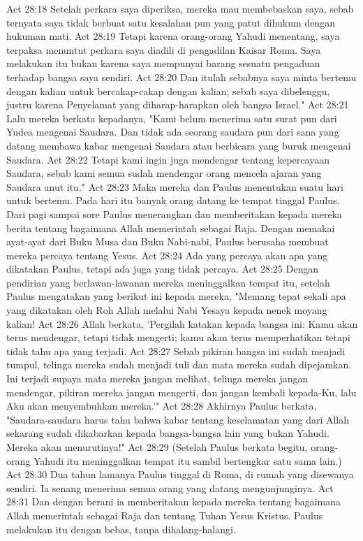 Act 28:18  Setelah perkara saya diperiksa, mereka mau membebaskan saya, sebab ternyata saya tidak berbuat satu kesalahan pun yang patut dihukum dengan hukuman mati.
Act 28:19  Tetapi karena orang-orang Yahudi menentang, saya terpaksa menuntut perkara saya diadili di pengadilan Kaisar Roma. Saya melakukan itu bukan karena saya mempunyai barang sesuatu pengaduan terhadap bangsa saya sendiri.
Act 28:20  Dan itulah sebabnya saya minta bertemu dengan kalian untuk bercakap-cakap dengan kalian; sebab saya dibelenggu, justru karena Penyelamat yang diharap-harapkan oleh bangsa Israel."
Act 28:21  Lalu mereka berkata kepadanya, "Kami belum menerima satu surat pun dari Yudea mengenai Saudara. Dan tidak ada seorang saudara pun dari sana yang datang membawa kabar mengenai Saudara atau berbicara yang buruk mengenai Saudara.
Act 28:22  Tetapi kami ingin juga mendengar tentang kepercayaan Saudara, sebab kami semua sudah mendengar orang mencela ajaran yang Saudara anut itu."
Act 28:23  Maka mereka dan Paulus menentukan suatu hari untuk bertemu. Pada hari itu banyak orang datang ke tempat tinggal Paulus. Dari pagi sampai sore Paulus menerangkan dan memberitakan kepada mereka berita tentang bagaimana Allah memerintah sebagai Raja. Dengan memakai ayat-ayat dari Buku Musa dan Buku Nabi-nabi, Paulus berusaha membuat mereka percaya tentang Yesus.
Act 28:24  Ada yang percaya akan apa yang dikatakan Paulus, tetapi ada juga yang tidak percaya.
Act 28:25  Dengan pendirian yang berlawan-lawanan mereka meninggalkan tempat itu, setelah Paulus mengatakan yang berikut ini kepada mereka, "Memang tepat sekali apa yang dikatakan oleh Roh Allah melalui Nabi Yesaya kepada nenek moyang kalian!
Act 28:26  Allah berkata, 'Pergilah katakan kepada bangsa ini: Kamu akan terus mendengar, tetapi tidak mengerti; kamu akan terus memperhatikan tetapi tidak tahu apa yang terjadi.
Act 28:27  Sebab pikiran bangsa ini sudah menjadi tumpul, telinga mereka sudah menjadi tuli dan mata mereka sudah dipejamkan. Ini terjadi supaya mata mereka jangan melihat, telinga mereka jangan mendengar, pikiran mereka jangan mengerti, dan jangan kembali kepada-Ku, lalu Aku akan menyembuhkan mereka.'"
Act 28:28  Akhirnya Paulus berkata, "Saudara-saudara harus tahu bahwa kabar tentang keselamatan yang dari Allah sekarang sudah dikabarkan kepada bangsa-bangsa lain yang bukan Yahudi. Mereka akan menurutinya!"
Act 28:29  (Setelah Paulus berkata begitu, orang-orang Yahudi itu meninggalkan tempat itu sambil bertengkar satu sama lain.)
Act 28:30  Dua tahun lamanya Paulus tinggal di Roma, di rumah yang disewanya sendiri. Ia senang menerima semua orang yang datang mengunjunginya.
Act 28:31  Dan dengan berani ia memberitakan kepada mereka tentang bagaimana Allah memerintah sebagai Raja dan tentang Tuhan Yesus Kristus. Paulus melakukan itu dengan bebas, tanpa dihalang-halangi.



